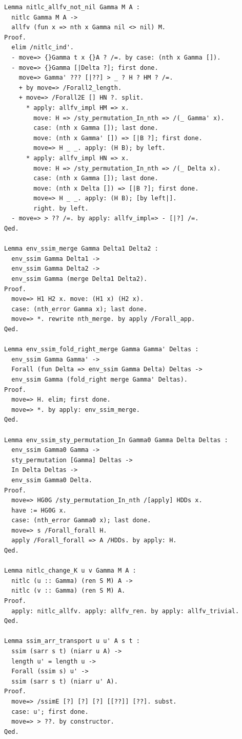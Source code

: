 \begin{lstlisting}[style=authorcoq]
Lemma nitlc_allfv_not_nil Gamma M A :
  nitlc Gamma M A ->
  allfv (fun x => nth x Gamma nil <> nil) M.
Proof.
  elim /nitlc_ind'.
  - move=> {}Gamma t x {}A ? /=. by case: (nth x Gamma []).
  - move=> {}Gamma [|Delta ?]; first done.
    move=> Gamma' ??? [|??] > _ ? H ? HM ? /=.
    + by move=> /Forall2_length.
    + move=> /Forall2E [] HN ?. split.
      * apply: allfv_impl HM => x.
        move: H => /sty_permutation_In_nth => /(_ Gamma' x).
        case: (nth x Gamma []); last done.
        move: (nth x Gamma' []) => [|B ?]; first done.
        move=> H _ _. apply: (H B); by left.
      * apply: allfv_impl HN => x.
        move: H => /sty_permutation_In_nth => /(_ Delta x).
        case: (nth x Gamma []); last done.
        move: (nth x Delta []) => [|B ?]; first done.
        move=> H _ _. apply: (H B); [by left|].
        right. by left.
  - move=> > ?? /=. by apply: allfv_impl=> - [|?] /=.
Qed.

Lemma env_ssim_merge Gamma Delta1 Delta2 :
  env_ssim Gamma Delta1 ->
  env_ssim Gamma Delta2 ->
  env_ssim Gamma (merge Delta1 Delta2).
Proof.
  move=> H1 H2 x. move: (H1 x) (H2 x).
  case: (nth_error Gamma x); last done.
  move=> *. rewrite nth_merge. by apply /Forall_app.
Qed.

Lemma env_ssim_fold_right_merge Gamma Gamma' Deltas :
  env_ssim Gamma Gamma' ->
  Forall (fun Delta => env_ssim Gamma Delta) Deltas ->
  env_ssim Gamma (fold_right merge Gamma' Deltas).
Proof.
  move=> H. elim; first done.
  move=> *. by apply: env_ssim_merge.
Qed.

Lemma env_ssim_sty_permutation_In Gamma0 Gamma Delta Deltas :
  env_ssim Gamma0 Gamma ->
  sty_permutation [Gamma] Deltas ->
  In Delta Deltas ->
  env_ssim Gamma0 Delta.
Proof.
  move=> HG0G /sty_permutation_In_nth /[apply] HDDs x.
  have := HG0G x.
  case: (nth_error Gamma0 x); last done.
  move=> s /Forall_forall H.
  apply /Forall_forall => A /HDDs. by apply: H.
Qed.

Lemma nitlc_change_K u v Gamma M A :
  nitlc (u :: Gamma) (ren S M) A ->
  nitlc (v :: Gamma) (ren S M) A.
Proof.
  apply: nitlc_allfv. apply: allfv_ren. by apply: allfv_trivial.
Qed.

Lemma ssim_arr_transport u u' A s t :
  ssim (sarr s t) (niarr u A) ->
  length u' = length u ->
  Forall (ssim s) u' ->
  ssim (sarr s t) (niarr u' A).
Proof.
  move=> /ssimE [?] [?] [?] [[??]] [??]. subst.
  case: u'; first done.
  move=> > ??. by constructor.
Qed.


\end{lstlisting}
